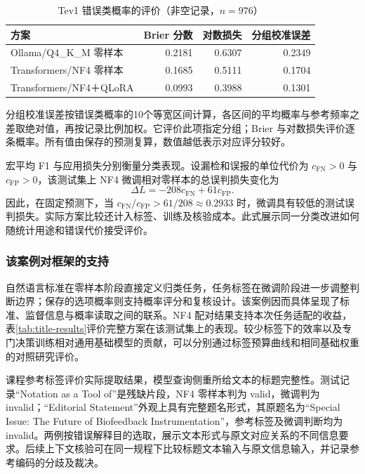 \documentclass[UTF8,a4paper,zihao=-4,fontset=fandol]{ctexart}
\begin{document}
\begin{table}[htbp]
\centering\small
\caption{Tev1 错误类概率的评价（非空记录，$n=976$）}\label{tab:title-probability}
\begin{tabularx}{\textwidth}{@{}Yrrr@{}}
\toprule
方案 & Brier 分数 & 对数损失 & 分组校准误差 \\
\midrule
Ollama/Q4\_K\_M 零样本 & 0.2181 & 0.6307 & 0.2349 \\
Transformers/NF4 零样本 & 0.1685 & 0.5111 & 0.1704 \\
Transformers/NF4＋QLoRA & 0.0993 & 0.3988 & 0.1301 \\
\bottomrule
\end{tabularx}
\vspace{0.35em}
\parbox{\textwidth}{\footnotesize 分组校准误差按错误类概率的10个等宽区间计算，各区间的平均概率与参考频率之差取绝对值，再按记录比例加权。它评价此项指定分组；Brier 与对数损失评价逐条概率。所有值由保存的预测复算，数值越低表示对应评分较好。}
\end{table}

宏平均 F1 与应用损失分别衡量分类表现。设漏检和误报的单位代价为 $c_{\mathrm{FN}}>0$ 与 $c_{\mathrm{FP}}>0$，该测试集上 NF4 微调相对零样本的总误判损失变化为
\begin{equation}
 \Delta L=-208c_{\mathrm{FN}}+61c_{\mathrm{FP}}.
 \label{eq:title-cost}
\end{equation}
因此，在固定预测下，当 $c_{\mathrm{FN}}/c_{\mathrm{FP}}>61/208\approx0.2933$ 时，微调具有较低的测试误判损失。实际方案比较还计入标签、训练及核验成本。此式展示同一分类改进如何随统计用途和错误代价接受评价。

\subsubsection{该案例对框架的支持}

自然语言标准在零样本阶段直接定义归类任务，任务标签在微调阶段进一步调整判断边界；保存的选项概率则支持概率评分和复核设计。该案例因而具体呈现了标准、监督信息与概率读取之间的联系。NF4 配对结果支持本次任务适配的收益，表\ref{tab:title-results}评价完整方案在该测试集上的表现。较少标签下的效率以及专门决策训练相对通用基础模型的贡献，可以分别通过标签预算曲线和相同基础权重的对照研究评价。

课程参考标签评价实际提取结果，模型查询侧重所给文本的标题完整性。测试记录“Notation as a Tool of”是残缺片段，NF4 零样本判为 valid，微调判为 invalid；“Editorial Statement”外观上具有完整题名形式，其原题名为“Special Issue: The Future of Biofeedback Instrumentation”，参考标签及微调判断均为 invalid。两例按错误解释目的选取，展示文本形式与原文对应关系的不同信息要求。后续上下文核验可在同一规程下比较标题文本输入与原文信息输入，并记录参考编码的分歧及裁决。
\end{document}
